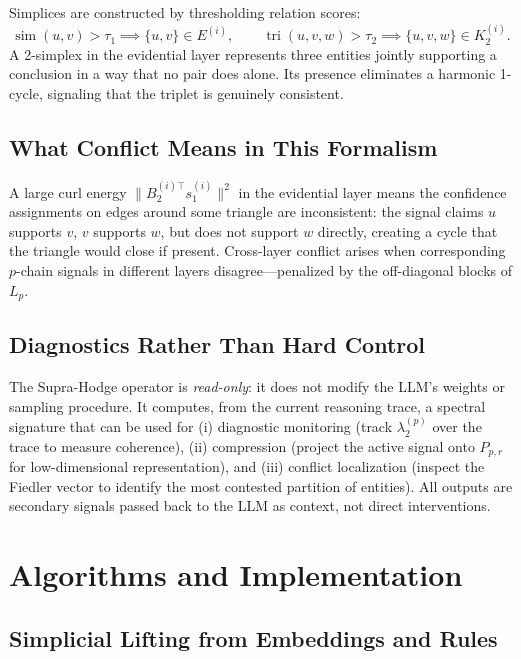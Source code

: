 \documentclass[11pt]{article}
\theoremstyle{definition}
\theoremstyle{remark}
\newcommand{\Pp}{P_{p,r}}
\DeclareMathOperator{\simop}{sim}
\DeclareMathOperator{\tri}{tri}
\begin{document}
Simplices are constructed by thresholding relation scores:
\[
  \simop(u,v)>\tau_1 \implies \{u,v\}\in E^{(i)},\qquad
  \tri(u,v,w)>\tau_2 \implies \{u,v,w\}\in K_2^{(i)}.
\]
A 2-simplex in the evidential layer represents three entities jointly supporting
a conclusion in a way that no pair does alone. Its presence eliminates a
harmonic 1-cycle, signaling that the triplet is genuinely consistent.

\subsection{What Conflict Means in This Formalism}

A large curl energy $\|B_2^{(i)\top}s_1^{(i)}\|^2$ in the evidential layer
means the confidence assignments on edges around some triangle are
inconsistent: the signal claims $u$ supports $v$, $v$ supports $w$, but does
not support $w$ directly, creating a cycle that the triangle would close if
present. Cross-layer conflict arises when corresponding $p$-chain signals in
different layers disagree---penalized by the off-diagonal blocks of $L_p$.

\subsection{Diagnostics Rather Than Hard Control}

The Supra-Hodge operator is \emph{read-only}: it does not modify the LLM's
weights or sampling procedure. It computes, from the current reasoning trace, a
spectral signature that can be used for (i) diagnostic monitoring (track
$\lambda_2^{(p)}$ over the trace to measure coherence), (ii) compression
(project the active signal onto $\Pp$ for low-dimensional representation), and
(iii) conflict localization (inspect the Fiedler vector to identify the
most contested partition of entities). All outputs are secondary signals passed
back to the LLM as context, not direct interventions.


\section{Algorithms and Implementation}
\label{sec:algorithms}

\subsection{Simplicial Lifting from Embeddings and Rules}
\end{document}
